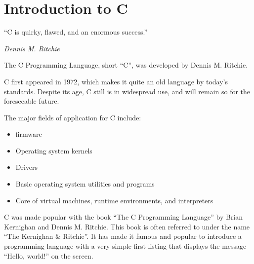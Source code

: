 \chapter{Introduction to C}
\epigraph{``C is quirky, flawed, and an enormous success.''}{\em Dennis M. Ritchie\em}

The C Programming Language, short ``C'', was developed by Dennis M. Ritchie.

C first appeared in 1972, which makes it quite an old language by today's standards.
Despite its age, C still is in widespread use, and will remain so for the foreseeable future.

The major fields of application for C include:
\begin{itemize}
\item \Gls{firmware}
\item Operating system kernels
\item Drivers
\item Basic operating system utilities and programs
\item Core of virtual machines, runtime environments, and interpreters
\end{itemize}

C was made popular with the book ``The C Programming Language''\cite{kernighanAndRitchie} by Brian Kernighan and Dennis M. Ritchie.
This book is often referred to under the name ``The Kernighan \& Ritchie''.
It has made it famous and popular to introduce a programming language with a very simple first listing that displays the message ``Hello, world!'' on the screen.



